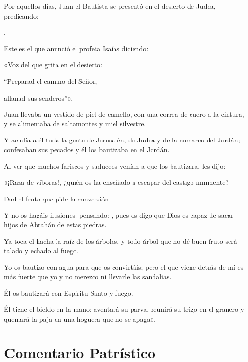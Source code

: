 
		\begin{scripture}
			
			Por aquellos días, Juan el Bautista se presentó en el desierto de Judea,
	predicando: 
	
			.
	
			Este es el que anunció el profeta Isaías diciendo:
			
			«Voz del que grita en el desierto: 
			
			``Preparad el camino del Señor, 
			
			allanad sus senderos''». 
			
			Juan llevaba un vestido de piel de camello, con una correa de cuero a la cintura, y se alimentaba de saltamontes y miel silvestre. 
			
			Y acudía a él toda la gente de Jerusalén, de Judea y de la comarca del Jordán; confesaban sus pecados y él los bautizaba en el Jordán. 
			
			Al ver que muchos fariseos y saduceos venían a que los bautizara, les dijo: 
			
			«¡Raza de víboras!, ¿quién os ha enseñado a escapar del castigo inminente? 
			
			Dad el fruto que pide la conversión. 
			
			Y no os hagáis ilusiones, pensando: , pues os digo que Dios es capaz de sacar hijos de Abrahán de estas piedras. 
			
			Ya toca el hacha la raíz de los árboles, y todo árbol que no dé buen fruto será talado y echado al fuego. 
			
			Yo os bautizo con agua para que os convirtáis; pero el que viene detrás de mí es más fuerte que yo y no merezco ni llevarle las sandalias. 
			
			Él os bautizará con Espíritu Santo y fuego. 
			
			Él tiene el bieldo en la mano: aventará su parva, reunirá su trigo en el granero y quemará la paja en una hoguera que no se apaga».
		\end{scripture}
	
\newsection

	\section{Comentario Patrístico} 

